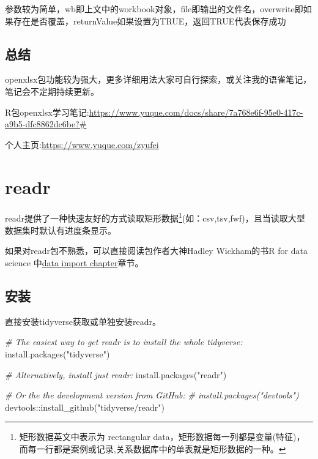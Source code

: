\documentclass[
]{book}
\newenvironment{Shaded}{\begin{snugshade}}{\end{snugshade}}
\newcommand{\CommentTok}[1]{\textcolor[rgb]{0.56,0.35,0.01}{\textit{#1}}}
\newcommand{\FunctionTok}[1]{\textcolor[rgb]{0.00,0.00,0.00}{#1}}
\newcommand{\NormalTok}[1]{#1}
\newcommand{\SpecialCharTok}[1]{\textcolor[rgb]{0.00,0.00,0.00}{#1}}
\newcommand{\StringTok}[1]{\textcolor[rgb]{0.31,0.60,0.02}{#1}}
\begin{document}
参数较为简单，wb即上文中的workbook对象，file即输出的文件名，overwrite即如果存在是否覆盖，returnValue如果设置为TRUE，返回TRUE代表保存成功

\hypertarget{ux603bux7ed3}{%
\subsection{总结}\label{ux603bux7ed3}}

openxlsx包功能较为强大，更多详细用法大家可自行探索，或关注我的语雀笔记，笔记会不定期持续更新。

R包openxlsx学习笔记:\url{https://www.yuque.com/docs/share/7a768e6f-95e0-417c-a9b5-dfc8862dc6be?\#}

个人主页:\url{https://www.yuque.com/zyufei}

\hypertarget{readr:package}{%
\section{readr}\label{readr:package}}

readr提供了一种快速友好的方式读取矩形数据\footnote{矩形数据英文中表示为 rectangular data，矩形数据每一列都是变量(特征)，而每一行都是案例或记录,关系数据库中的单表就是矩形数据的一种。}(如：csv,tsv,fwf)，且当读取大型数据集时默认有进度条显示。

如果对readr包不熟悉，可以直接阅读包作者大神Hadley Wickham的书R for data science 中\href{https://r4ds.had.co.nz/data-import.html}{data import chapter}章节。

\hypertarget{readr:install}{%
\subsection{安装}\label{readr:install}}

直接安装tidyverse获取或单独安装readr。

\begin{Shaded}
\begin{Highlighting}[]
\CommentTok{\# The easiest way to get readr is to install the whole tidyverse:}
\FunctionTok{install.packages}\NormalTok{(}\StringTok{"tidyverse"}\NormalTok{)}

\CommentTok{\# Alternatively, install just readr:}
\FunctionTok{install.packages}\NormalTok{(}\StringTok{"readr"}\NormalTok{)}

\CommentTok{\# Or the the development version from GitHub:}
\CommentTok{\# install.packages("devtools")}
\NormalTok{devtools}\SpecialCharTok{::}\FunctionTok{install\_github}\NormalTok{(}\StringTok{"tidyverse/readr"}\NormalTok{)}
\end{Highlighting}
\end{Shaded}
\end{document}
